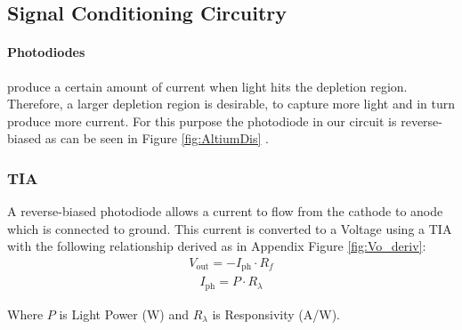 \subsection{Signal Conditioning Circuitry} %
\label{subsec:SignalConditioningCircuitry}

\paragraph{Photodiodes} produce a certain amount of current when light hits the depletion region. Therefore, a larger depletion region is desirable, to capture more light and in turn produce more current. For this purpose the photodiode in our circuit is reverse-biased as can be seen in Figure \ref{fig:AltiumDis} \cite[p.155]{RefWorks:keiser2021fiber}. 

%
\subsubsection{\acf{TIA}}
A reverse-biased photodiode allows a current to flow from the cathode to anode which is connected to ground. This current is converted to a Voltage using a \ac{TIA} with the following relationship derived as in Appendix Figure \ref{fig:Vo_deriv}:
\begin{equation} \label{eq:TIAoutput} %
  \begin{split}
  V_{\text{out}} = - I_{\text{ph}} \cdot R_f
  \end{split}
\end{equation}
\begin{equation} \label{eq:Photocurrent} %
  \begin{split}
  I_{\text{ph}} = P \cdot R_{\lambda}
  \end{split}
\end{equation}

Where $P$ is Light Power (W) and $R_{\lambda}$ is Responsivity (A/W).

